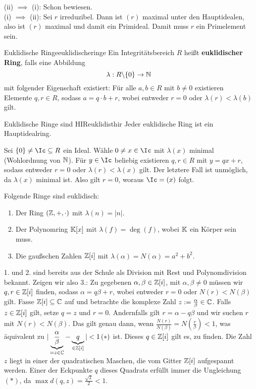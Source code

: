 \begin{beweis}
(ii) $\implies$ (i): Schon bewiesen.\\
(i) $\implies$ (ii): Sei $r$ irreduzibel. Dann ist $(r)$ maximal unter den Hauptidealen, also ist $(r)$ maximal und damit ein Primideal. Damit muss $r$ ein Primelement sein.
\end{beweis}
\begin{definition}{Euklidische Ringe}{euklidischeringe}
Ein Integritätsbereich $R$ heißt \textbf{euklidischer Ring}, falls eine Abbildung
\begin{equation}
\lambda: R \backslash \{0\} \to \mathbb{N}
\end{equation}
mit folgender Eigenschaft existiert: Für alle $a,b \in R$ mit $b \neq 0$ existieren Elemente $q, r \in R$, sodass $a = q \cdot b + r$, wobei entweder $r=0$ oder $\lambda (r) < \lambda (b)$ gilt.
\end{definition}
\begin{satz}{Euklidische Ringe sind HIR}{euklidisthir}
Jeder euklidische Ring ist ein Hauptidealring.
\end{satz}
\begin{beweis}
Sei $\{0\} \neq \Ic \sub R$ ein Ideal. Wähle $0 \neq x \in \Ic$ mit $\lambda (x)$ minimal (Wohlordnung von $\mathbb{N}$). Für $y \in \Ic$ beliebig existieren $q,r \in R$ mit $y = qx +r$, sodass entweder $r=0$ oder $\lambda(r) < \lambda (x)$ gilt. Der letztere Fall ist unmöglich, da $\lambda(x)$ minimal ist. Also gilt $r=0$, woraus $\Ic = (x)$ folgt.
\end{beweis}
\begin{beispiele}
Folgende Ringe sind euklidisch:
\begin{enumerate}
\item Der Ring $(\mathbb{Z}, +, \cdot)$ mit $\lambda (n) = |n|$.
\item Der Polynomring $\mathbb{K}[x]$ mit $\lambda(f) = \deg (f)$, wobei $\mathbb{K}$ ein Körper sein muss.
\item Die gaußschen Zahlen $\mathbb{Z}[i]$ mit $\lambda(\alpha) = N(\alpha) = a^2 +b^2$.
\end{enumerate}
\begin{beweis}
1. und 2. sind bereits aus der Schule als Division mit Rest und Polynomdivision bekannt. Zeigen wir also 3.: Zu gegebenen $\alpha, \beta \in \mathbb{Z}[i]$, mit $\alpha, \beta \neq 0$ müssen wir $q,r \in \mathbb{Z}[i]$ finden, sodass $\alpha = q \beta +r$, wobei entweder $r=0$ oder $N(r) < N(\beta)$ gilt. Fasse $\mathbb{Z}[i] \subseteq \mathbb{C}$ auf und betrachte die komplexe Zahl $z:= \frac{\alpha}{\beta} \in \mathbb{C}$. Falls $z \in \mathbb{Z}[i]$ gilt, setze $q = z$ und $r=0$. Andernfalls gilt $r = \alpha - q \beta$ und wir suchen $r$ mit $N(r) < N(\beta)$. Das gilt genau dann, wenn $\frac{N(r)}{N(\beta)} = N\left(\frac{r}{\beta}\right) < 1$, was äquivalent zu $| \underbrace{\frac{\alpha}{\beta}}_{=z \in \mathbb{C}} -\underbrace{q}_{\in \mathbb{Z}[i]} | < 1 \, (\ast)$ ist. Dieses $q\in \mathbb{Z}[i]$ gilt es, zu finden. Die Zahl $z$ liegt in einer der quadratischen Maschen, die vom Gitter $\mathbb{Z}[i]$ aufgespannt werden. Einer der Eckpunkte $q$ dieses Quadrats erfüllt immer die Ungleichung $(\ast)$, da $\max d(q,z) = \frac{\sqrt{2}}{2} < 1$.
\end{beweis}
\end{beispiele}
